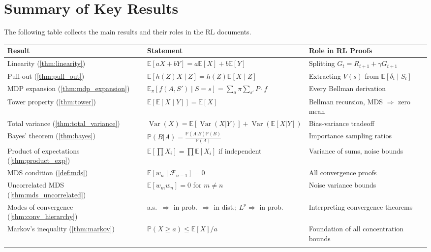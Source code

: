 \documentclass[11pt,a4paper]{article}
\theoremstyle{definition}
\theoremstyle{plain}
\theoremstyle{remark}
\DeclareMathOperator{\Var}{Var}
\newcommand{\E}{\mathbb{E}}
\newcommand{\Prob}{\mathbb{P}}
\begin{document}
\section{Summary of Key Results}
\label{sec:summary}

The following table collects the main results and their roles in the RL documents.

\begin{center}
\renewcommand{\arraystretch}{1.5}
\begin{tabular}{p{3.8cm} p{5cm} p{5cm}}
\toprule
\textbf{Result} & \textbf{Statement} & \textbf{Role in RL Proofs} \\
\midrule
Linearity (\ref{thm:linearity}) & $\E[aX + bY] = a\E[X] + b\E[Y]$ & Splitting $G_t = R_{t+1} + \gamma G_{t+1}$ \\
\addlinespace
Pull-out (\ref{thm:pull_out}) & $\E[h(Z)X \mid Z] = h(Z)\E[X \mid Z]$ & Extracting $V(s)$ from $\E[\delta_t \mid S_t]$ \\
\addlinespace
MDP expansion (\ref{thm:mdp_expansion}) & $\E_\pi[f(A,S') \mid S\!=\!s] = \sum_a \pi \sum_{s'} P \cdot f$ & Every Bellman derivation \\
\addlinespace
Tower property (\ref{thm:tower}) & $\E[\E[X \mid Y]] = \E[X]$ & Bellman recursion, MDS $\Rightarrow$ zero mean \\
\addlinespace
Total variance (\ref{thm:total_variance}) & $\Var(X) = \E[\Var(X|Y)] + \Var(\E[X|Y])$ & Bias-variance tradeoff \\
\addlinespace
Bayes' theorem (\ref{thm:bayes}) & $\Prob(B|A) = \frac{\Prob(A|B)\Prob(B)}{\Prob(A)}$ & Importance sampling ratios \\
\addlinespace
Product of expectations (\ref{thm:product_exp}) & $\E[\prod X_i] = \prod \E[X_i]$ if independent & Variance of sums, noise bounds \\
\addlinespace
MDS condition (\ref{def:mds}) & $\E[w_n \mid \mathcal{F}_{n-1}] = 0$ & All convergence proofs \\
\addlinespace
Uncorrelated MDS (\ref{thm:mds_uncorrelated}) & $\E[w_m w_n] = 0$ for $m \neq n$ & Noise variance bounds \\
\addlinespace
Modes of convergence (\ref{thm:conv_hierarchy}) & a.s.\ $\Rightarrow$ in prob.\ $\Rightarrow$ in dist.; $L^p \Rightarrow$ in prob. & Interpreting convergence theorems \\
\addlinespace
Markov's inequality (\ref{thm:markov}) & $\Prob(X \geq a) \leq \E[X]/a$ & Foundation of all concentration bounds \\
\addlinespace

\end{tabular}
\end{center}
\end{document}
